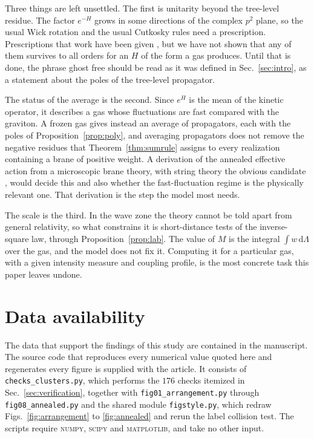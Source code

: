 \documentclass[aps,prd,10pt,twocolumn,superscriptaddress,nofootinbib,floatfix,longbibliography,showpacs,showkeys]{revtex4-2}
\theoremstyle{plain}
\theoremstyle{definition}
\theoremstyle{remark}
\newcommand{\dd}{\mathrm{d}}
\newif\ifzenodo
\newcommand{\zenododoi}{10.5281/zenodo.22866290}
\begin{document}
Three things are left unsettled. The first is unitarity beyond the tree-level residue. The factor $e^{-H}$ grows in some directions of the complex $p^2$ plane, so the usual Wick rotation and the usual Cutkosky rules need a prescription. Prescriptions that work have been given \cite{PiusSen2016,BrisceseModesto2019}, but we have not shown that any of them survives to all orders for an $H$ of the form a gas produces. Until that is done, the phrase ghost free should be read as it was defined in Sec.~\ref{sec:intro}, as a statement about the poles of the tree-level propagator.

The status of the average is the second. Since $e^{H}$ is the mean of the kinetic operator, it describes a gas whose fluctuations are fast compared with the graviton. A frozen gas gives instead an average of propagators, each with the poles of Proposition~\ref{prop:poly}, and averaging propagators does not remove the negative residues that Theorem~\ref{thm:sumrule} assigns to every realization containing a brane of positive weight. A derivation of the annealed effective action from a microscopic brane theory, with string theory the obvious candidate \cite{Polchinski1995,Johnson2003}, would decide this and also whether the fast-fluctuation regime is the physically relevant one. That derivation is the step the model most needs.

The scale is the third. In the wave zone the theory cannot be told apart from general relativity, so what constrains it is short-distance tests of the inverse-square law, through Proposition~\ref{prop:lab}. The value of $M$ is the integral $\int w\,\dd\Lambda$ over the gas, and the model does not fix it. Computing it for a particular gas, with a given intensity measure and coupling profile, is the most concrete task this paper leaves undone.

\section*{Data availability}

The data that support the findings of this study are contained in the manuscript. The source code that reproduces every numerical value quoted here and regenerates every figure is supplied with the article\ifzenodo{} and is archived at \href{https://doi.org/\zenododoi}{\nolinkurl{doi:\zenododoi}}\fi. It consists of \texttt{checks\_clusters.py}, which performs the $176$ checks itemized in Sec.~\ref{sec:verification}, together with \texttt{fig01\_arrangement.py} through \texttt{fig08\_annealed.py} and the shared module \texttt{figstyle.py}, which redraw Figs.~\ref{fig:arrangement} to \ref{fig:annealed} and rerun the label collision test. The scripts require \textsc{numpy}, \textsc{scipy} and \textsc{matplotlib}, and take no other input.
\end{document}
